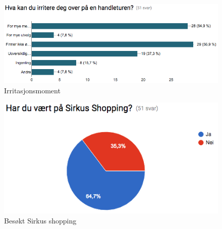 \begin{figure}[H]
\includegraphics[scale=0.6]{images/sporreundersokelse/irritasjonsmoment}
\centering %
\caption{Irritasjonsmoment}
\label{fig:irritasjonsmoment}
\end{figure}

\begin{figure}[H]
\includegraphics[scale=0.6]{images/sporreundersokelse/besokt}
\centering %
\caption{Besøkt Sirkus shopping}
\label{fig:besokt}
\end{figure}

